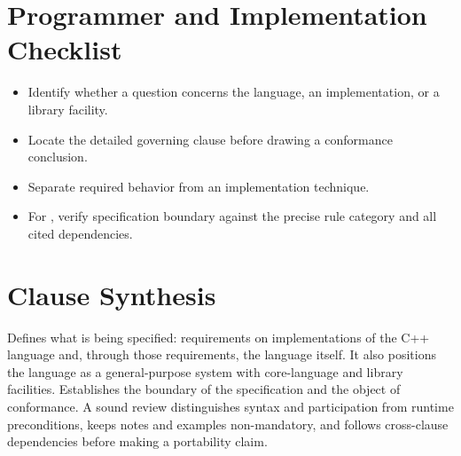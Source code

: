 \documentclass[11pt,letterpaper]{article}
\begin{document}
\section{Programmer and Implementation Checklist}
\begin{CornellReferenceChecklistBox}\begin{itemize}[label=$\square$]
\item Identify whether a question concerns the language, an implementation, or a library facility.
\item Locate the detailed governing clause before drawing a conformance conclusion.
\item Separate required behavior from an implementation technique.
\item For , verify specification boundary against the precise rule category and all cited dependencies.
\end{itemize}\end{CornellReferenceChecklistBox}
\section{Clause Synthesis}
\begin{CornellReferenceOrientationBox}Defines what is being specified: requirements on implementations of the C++ language and, through those requirements, the language itself. It also positions the language as a general-purpose system with core-language and library facilities. Establishes the boundary of the specification and the object of conformance. A sound review distinguishes syntax and participation from runtime preconditions, keeps notes and examples non-mandatory, and follows cross-clause dependencies before making a portability claim.\end{CornellReferenceOrientationBox}
\end{document}
